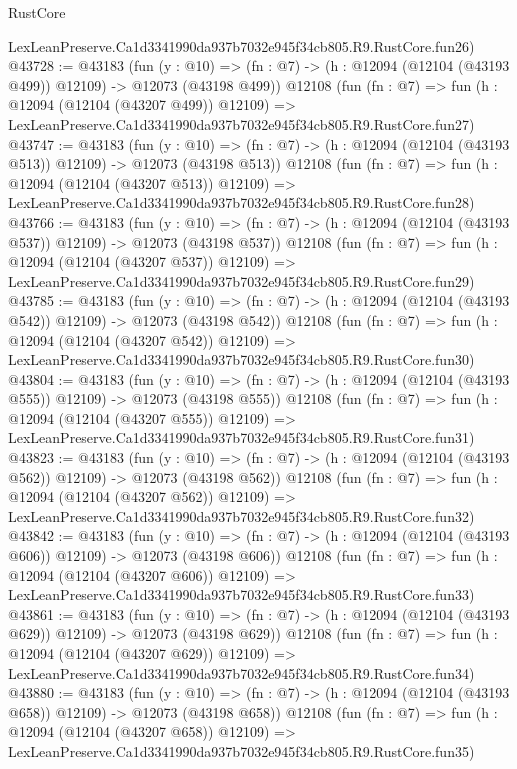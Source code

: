 \begin{lexlean}{RustCore}
\begin{coremodule}
    LexLeanPreserve.Ca1d3341990da937b7032e945f34cb805.R9.RustCore.fun26)
@43728 := @43183
    (fun (y : @10) =>
    (fn : @7) -> (h : @12094 (@12104 (@43193 @499)) @12109) -> @12073 (@43198 @499))
    @12108
    (fun (fn : @7) =>
    fun (h : @12094 (@12104 (@43207 @499)) @12109) =>
    LexLeanPreserve.Ca1d3341990da937b7032e945f34cb805.R9.RustCore.fun27)
@43747 := @43183
    (fun (y : @10) =>
    (fn : @7) -> (h : @12094 (@12104 (@43193 @513)) @12109) -> @12073 (@43198 @513))
    @12108
    (fun (fn : @7) =>
    fun (h : @12094 (@12104 (@43207 @513)) @12109) =>
    LexLeanPreserve.Ca1d3341990da937b7032e945f34cb805.R9.RustCore.fun28)
@43766 := @43183
    (fun (y : @10) =>
    (fn : @7) -> (h : @12094 (@12104 (@43193 @537)) @12109) -> @12073 (@43198 @537))
    @12108
    (fun (fn : @7) =>
    fun (h : @12094 (@12104 (@43207 @537)) @12109) =>
    LexLeanPreserve.Ca1d3341990da937b7032e945f34cb805.R9.RustCore.fun29)
@43785 := @43183
    (fun (y : @10) =>
    (fn : @7) -> (h : @12094 (@12104 (@43193 @542)) @12109) -> @12073 (@43198 @542))
    @12108
    (fun (fn : @7) =>
    fun (h : @12094 (@12104 (@43207 @542)) @12109) =>
    LexLeanPreserve.Ca1d3341990da937b7032e945f34cb805.R9.RustCore.fun30)
@43804 := @43183
    (fun (y : @10) =>
    (fn : @7) -> (h : @12094 (@12104 (@43193 @555)) @12109) -> @12073 (@43198 @555))
    @12108
    (fun (fn : @7) =>
    fun (h : @12094 (@12104 (@43207 @555)) @12109) =>
    LexLeanPreserve.Ca1d3341990da937b7032e945f34cb805.R9.RustCore.fun31)
@43823 := @43183
    (fun (y : @10) =>
    (fn : @7) -> (h : @12094 (@12104 (@43193 @562)) @12109) -> @12073 (@43198 @562))
    @12108
    (fun (fn : @7) =>
    fun (h : @12094 (@12104 (@43207 @562)) @12109) =>
    LexLeanPreserve.Ca1d3341990da937b7032e945f34cb805.R9.RustCore.fun32)
@43842 := @43183
    (fun (y : @10) =>
    (fn : @7) -> (h : @12094 (@12104 (@43193 @606)) @12109) -> @12073 (@43198 @606))
    @12108
    (fun (fn : @7) =>
    fun (h : @12094 (@12104 (@43207 @606)) @12109) =>
    LexLeanPreserve.Ca1d3341990da937b7032e945f34cb805.R9.RustCore.fun33)
@43861 := @43183
    (fun (y : @10) =>
    (fn : @7) -> (h : @12094 (@12104 (@43193 @629)) @12109) -> @12073 (@43198 @629))
    @12108
    (fun (fn : @7) =>
    fun (h : @12094 (@12104 (@43207 @629)) @12109) =>
    LexLeanPreserve.Ca1d3341990da937b7032e945f34cb805.R9.RustCore.fun34)
@43880 := @43183
    (fun (y : @10) =>
    (fn : @7) -> (h : @12094 (@12104 (@43193 @658)) @12109) -> @12073 (@43198 @658))
    @12108
    (fun (fn : @7) =>
    fun (h : @12094 (@12104 (@43207 @658)) @12109) =>
    LexLeanPreserve.Ca1d3341990da937b7032e945f34cb805.R9.RustCore.fun35)

\end{coremodule}
\end{lexlean}
